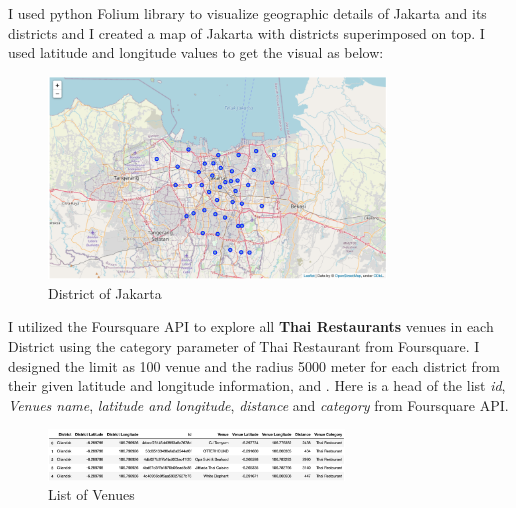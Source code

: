 \documentclass[12pt,a4paper]{article}
\begin{document}
I used python Folium library to visualize geographic details of Jakarta and its districts and I created a map of Jakarta with districts superimposed on top. I used latitude and longitude values to get the visual as below:

\begin{center}
    \begin{figure}[htp]
    \begin{center}
     \includegraphics[width=0.8\textwidth]{fig/jakarta}
    \end{center}
    \caption{District of Jakarta}
    \label{fig:jakarta}
    \end{figure}
\end{center}

I utilized the Foursquare API to explore all \textbf{Thai Restaurants} venues in each District using the category parameter of Thai Restaurant from Foursquare. I designed the limit as 100 venue and the radius 5000 meter for each district from their given latitude and longitude information, and . Here is a head of the list \textit{id}, \textit{Venues name}, \textit{latitude and longitude}, \textit{distance} and \textit{category} from Foursquare API.

\begin{center}
    \begin{figure}[htp]
    \begin{center}
     \includegraphics[width=0.7\textwidth]{fig/venues}
    \end{center}
    \caption{List of Venues}
    \label{fig:venues}
    \end{figure}
\end{center}

\clearpage
\end{document}
